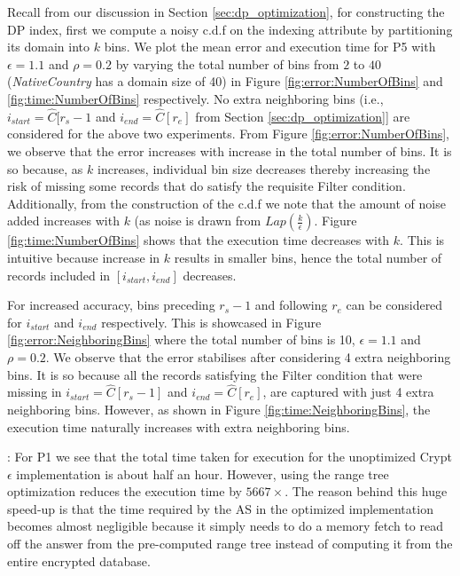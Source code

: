 Recall from our discussion in Section \ref{sec:dp_optimization}, for constructing the DP index, first we compute a noisy c.d.f on the indexing attribute by partitioning its domain into $k$ bins. We plot the mean error and execution time for P5 with $\epsilon=1.1$ and $\rho=0.2$ by varying the total number of bins from $2$ to $40$ (\textit{NativeCountry} has a domain size of 40) in Figure \ref{fig:error:NumberOfBins} and \ref{fig:time:NumberOfBins} respectively. No extra neighboring bins (i.e., $i_{start}=\hat{C}[r_s-1$ and  $i_{end}=\hat{C}[r_e]$ from Section \ref{sec:dp_optimization}] are considered for the above two experiments. From Figure \ref{fig:error:NumberOfBins}, we observe that the error increases with increase in the total number of bins. It is so because, as $k$ increases, individual bin size decreases thereby increasing the risk of missing some records that do satisfy the requisite \textsf{Filter} condition. Additionally, from the construction of the c.d.f we note that the amount of noise added increases with $k$ (as noise is drawn from $Lap(\frac{k}{\epsilon})$. Figure \ref{fig:time:NumberOfBins} shows that the execution time decreases with $k$. This is intuitive because increase in $k$ results in smaller bins, hence the total number of records included in $[i_{start}, i_{end}]$ decreases.

For increased accuracy,  bins preceding $r_s-1$ and following $r_e$ can be considered for $i_{start}$ and $i_{end}$ respectively. This is showcased in Figure \ref{fig:error:NeighboringBins} where the total number of bins is 10, $\epsilon=1.1$ and $\rho=0.2$. We observe that the error stabilises after considering 4 extra neighboring bins. It is so because all the records satisfying the \textsf{Filter} condition that were missing in $i_{start}=\hat{C}[r_s-1]$ and  $i_{end}=\hat{C}[r_e]$, are captured with just 4 extra neighboring bins. However, as shown in Figure \ref{fig:time:NeighboringBins}, the execution time naturally increases with extra neighboring bins.

:
For P1 we see that the total time taken for execution for the unoptimized Crypt$\epsilon$ implementation is about half an hour. However, using the range tree optimization reduces the execution time by $5667\times$. The reason behind this huge speed-up is that the time required by the \textsf{AS} in the optimized implementation becomes almost negligible because it simply needs to do a memory fetch to read off the answer from the pre-computed range tree instead of computing it from the entire encrypted database.

